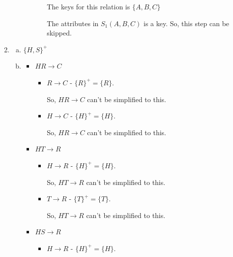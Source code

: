 \documentclass[12pt]{article}
\begin{document}
\begin{enumerate}[1.]
\begin{enumerate}[a)]
\begin{enumerate}[i)]
\begin{enumerate}[1.]
                \bigskip

                \color{red}
                The keys for this relation is $\{A,B,C\}$

                \bigskip

                The attributes in $S_1(A,B,C)$ is a key. So, this step can be skipped.
                \color{black}

                \bigskip

            \end{enumerate}
        \end{enumerate}

    \end{enumerate}

    \item


    \begin{enumerate}[a)]
        \item $\{H,S\}^+$
        \item

        \begin{itemize}
            \item $HR \to C$
            \begin{itemize}
                \item $R \to C$ - $\{R\}^+ = \{R\}$.

                \bigskip

                So, $HR \to C$ can't be simplified to this.

                \item $H \to C$ - $\{H\}^+ = \{H\}$.

                \bigskip

                So, $HR \to C$ can't be simplified to this.
            \end{itemize}

            \item $HT \to R$
            \begin{itemize}
                \item $H \to R$ - $\{H\}^+ = \{H\}$.

                \bigskip

                So, $HT \to R$ can't be simplified to this.

                \item $T \to R$ - $\{T\}^+ = \{T\}$.

                \bigskip

                So, $HT \to R$ can't be simplified to this.
            \end{itemize}
            \item $HS \to R$
            \begin{itemize}
                \item $H \to R$ - $\{H\}^+ = \{H\}$.


\end{itemize}
\end{itemize}
\end{enumerate}
\end{enumerate}
\end{document}
